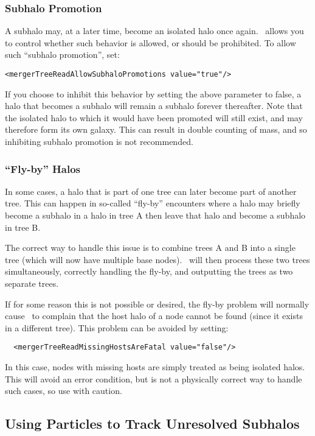 \subsubsection{Subhalo Promotion}

A subhalo may, at a later time, become an isolated halo once again. \glc\ allows you to control whether such behavior is allowed, or should be prohibited. To allow such ``subhalo promotion'', set:
\begin{verbatim}
<mergerTreeReadAllowSubhaloPromotions value="true"/>
\end{verbatim}
If you choose to inhibit this behavior by setting the above parameter to false, a halo that becomes a subhalo will remain a subhalo forever thereafter. Note that the isolated halo to which it would have been promoted will still exist, and may therefore form its own galaxy. This can result in double counting of mass, and so inhibiting subhalo promotion is not recommended.

\subsubsection{``Fly-by'' Halos}

In some cases, a halo that is part of one tree can later become part of another tree. This can happen in so-called ``fly-by'' encounters where a halo may briefly become a subhalo in a halo in tree A then leave that halo and become a subhalo in tree B.

The correct way to handle this issue is to combine trees A and B into a single tree (which will now have multiple base nodes). \glc\ will then process these two trees simultaneously, correctly handling the fly-by, and outputting the trees as two separate trees.

If for some reason this is not possible or desired, the fly-by problem will normally cause \glc\ to complain that the host halo of a node cannot be found (since it exists in a different tree). This problem can be avoided by setting:
\begin{verbatim}
  <mergerTreeReadMissingHostsAreFatal value="false"/>
\end{verbatim}
In this case, nodes with missing hosts are simply treated as being isolated halos. This will avoid an error condition, but is not a physically correct way to handle such cases, so use with caution.

\subsection{Using Particles to Track Unresolved Subhalos}

